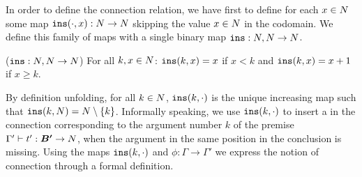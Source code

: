 In order to define the connection relation, we have first to define for each $x \in {N}$
some map ${\tt ins}(\cdot,x):{N} \rightarrow {N}$ skipping the value $x \in {N}$ in the codomain. 
We define this family of maps with a single binary map ${\tt ins}:{N},{N} \rightarrow {N}$.

\begin{definition}(${\tt ins}:{N},{N} \rightarrow {N}$)
For all $k,x \in {N}$: ${\tt ins}(k,x)=x$ if $x < k$ and ${\tt ins}(k,x)=x+1$ if $x \ge k$. 
\end{definition}

By definition unfolding, for all $k \in {N}$, ${\tt ins}(k,\cdot)$ is the unique increasing 
map such that ${\tt ins}(k,{N}) = {N} \setminus \{k\}$. 
Informally speaking, we use ${\tt ins}(k,\cdot)$ to insert a  in the 
connection corresponding to the argument number $k$ of the premise 
$\Gamma' \vdash t':\vec{B'} \rightarrow \N$, when the argument in the same position
in the conclusion is missing. 
Using the maps ${\tt ins}(k,\cdot)$ and $\phi:\Gamma \rightarrow \Gamma'$ we 
express the notion of connection through a formal definition.




